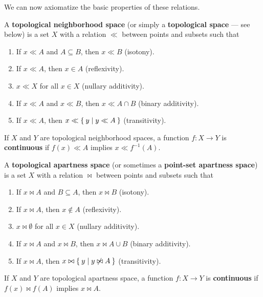 \documentclass{article}
\def\inv{^{-1}}
\begin{document}
We can now axiomatize the basic properties of these relations.

\begin{defn}
  A \textbf{topological neighborhood space} (or simply a \textbf{topological space} --- see below) is a set $X$ with a relation $\ll$ between points and subsets such that
  \begin{enumerate}
  \item If $x\ll A$ and $A\subseteq B$, then $x\ll B$ (isotony).
  \item If $x\ll A$, then $x\in A$ (reflexivity).
  \item $x\ll X$ for all $x\in X$ (nullary additivity).
  \item If $x\ll A$ and $x\ll B$, then $x\ll A\cap B$ (binary additivity).
  \item If $x\ll A$, then $x \ll \Set{ y | y\ll A}$ (transitivity).
  \end{enumerate}
  If $X$ and $Y$ are topological neighborhood spaces, a function $f:X\to Y$ is \textbf{continuous} if $f(x)\ll A$ implies $x\ll f\inv(A)$.
\end{defn}

\begin{defn}
  A \textbf{topological apartness space} (or sometimes a \textbf{point-set apartness space}) is a set $X$ with a relation $\bowtie$ between points and subsets such that
  \begin{enumerate}
  \item If $x\bowtie A$ and $B\subseteq A$, then $x\bowtie B$ (isotony).
  \item If $x\bowtie A$, then $x\notin A$ (reflexivity).
  \item $x\bowtie \emptyset$ for all $x\in X$ (nullary additivity).
  \item If $x\bowtie A$ and $x\bowtie B$, then $x\bowtie A\cup B$ (binary additivity).
  \item If $x\bowtie A$, then $x\bowtie \Set{ y | y \not\bowtie A }$ (transitivity).
  \end{enumerate}
  If $X$ and $Y$ are topological apartness space, a function $f:X\to Y$ is \textbf{continuous} if $f(x)\bowtie f(A)$ implies $x\bowtie A$.
\end{defn}
\end{document}
